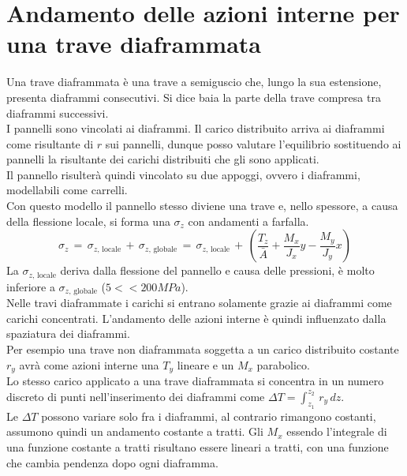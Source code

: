\section{Andamento delle azioni interne per una trave diaframmata}

Una trave diaframmata è una trave a semiguscio che, lungo la sua estensione, presenta diaframmi consecutivi. Si dice baia la parte della trave compresa tra diaframmi successivi.\\


I pannelli sono vincolati ai diaframmi. Il carico distribuito arriva ai diaframmi come risultante di $r$ sui pannelli, dunque posso valutare l'equilibrio sostituendo ai pannelli la risultante dei carichi distribuiti che gli sono applicati.\\
Il pannello risulterà quindi vincolato su due appoggi, ovvero i diaframmi, modellabili come carrelli.\\
Con questo modello il pannello stesso diviene una trave e, nello spessore, a causa della flessione locale, si forma una $\sigma_z$ con andamenti a farfalla.
\begin{equation*}
    \sigma_z\,=\, \sigma_{z,\,\mathrm{locale}}\,+\, \sigma_{z,\,\mathrm{globale}}
    \,=\, \sigma_{z,\,\mathrm{locale}}\,+\, \left(\frac{T_z}{\bar{A}}+\frac{M_x}{J_x}y-\frac{M_y}{J_y}x\right)
\end{equation*}
La $\sigma_{z,\,\mathrm{locale}}$ deriva dalla flessione del pannello e causa delle pressioni, è molto inferiore a $\sigma_{z,\,\mathrm{globale}}$
($5<<200MPa$).\\

Nelle travi diaframmate i carichi si entrano solamente grazie ai diaframmi come carichi concentrati. L'andamento delle azioni interne è quindi influenzato dalla spaziatura dei diaframmi.\\


Per esempio una trave non diaframmata soggetta a un carico distribuito costante $r_y$ avrà come azioni interne una $T_y$ lineare e un $M_x$ parabolico.\\
Lo stesso carico applicato a una trave diaframmata si concentra in un numero discreto di punti nell'inserimento dei diaframmi come $\Delta T = \int_{z_1}^{z_2}\,r_y\,dz$.\\
Le $   \Delta T$ possono variare solo fra i diaframmi, al contrario rimangono costanti, assumono quindi un andamento costante a tratti.
Gli $M_x$ essendo l'integrale di una funzione costante a tratti risultano essere lineari a tratti, con una funzione che cambia pendenza dopo ogni diaframma.

